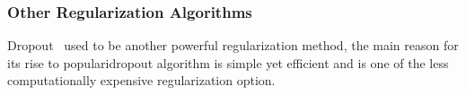 \subsubsection{Other Regularization Algorithms}

Dropout~\cite{JMLR:v15:srivastava14a} used to be another powerful regularization method, the main reason for its rise to popularidropout algorithm is simple yet efficient and is one of the less computationally expensive regularization option. 